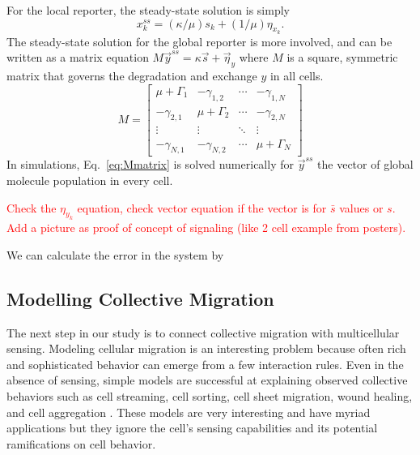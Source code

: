 \documentclass[a4paper]{article}
\renewcommand{\r}[1]{\textcolor{red}{#1}}
\begin{document}
For the local reporter, the steady-state solution is simply
\begin{equation} \label{eq:xss}
    x_{k}^{ss} = \left( \kappa/\mu \right) s_k + \left( 1/\mu \right) \eta_{x_k}.
\end{equation}
The steady-state solution for the global reporter is more involved, and can be written as a matrix equation $M\vec{y}^{ss} = \kappa\vec{s} + \vec{\eta}_y$ where $M$ is a square, symmetric matrix that governs the degradation and exchange $y$ in all cells.
\begin{equation} \label{eq:Mmatrix}
    M =
    \begin{bmatrix}
     \mu+\Gamma_1 & -\gamma_{1,2} & \cdots & -\gamma_{1,N} \\
     -\gamma_{2,1} & \mu+\Gamma_2 & \cdots & -\gamma_{2,N} \\
     \vdots  & \vdots  & \ddots & \vdots  \\
     -\gamma_{N,1} & -\gamma_{N,2} & \cdots & \mu+\Gamma_N
    \end{bmatrix}
\end{equation}
In simulations, Eq.\ \ref{eq:Mmatrix} is solved numerically for $\vec{y}^{ss}$ the vector of global molecule population in every cell.

\r{Check the $\eta_{y_k}$ equation, check vector equation if the vector is for $\bar{s}$ values or $s$. Add a picture as proof of concept of signaling (like 2 cell example from posters).}

We can calculate the error in the system by

\subsection{Modelling Collective Migration}

The next step in our study is to connect collective migration with multicellular sensing. Modeling cellular migration is an interesting problem because often rich and sophisticated behavior can emerge from a few interaction rules. Even in the absence of sensing, simple models are successful at explaining observed collective behaviors such as cell streaming, cell sorting, cell sheet migration, wound healing, and cell aggregation \cite{kabla2012collective,szabo2010collective,basan2013alignment,janulevicius2015short}. These models are very interesting and have myriad applications but they ignore the cell's sensing capabilities and its potential ramifications on cell behavior.
\end{document}
